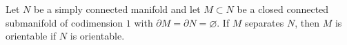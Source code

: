 Let $N$ be a simply connected manifold and let $M \subset N$ be a closed connected submanifold of codimension $1$ with $\partial M = \partial N = \varnothing$. If $M$ separates $N$, then $M$ is orientable if $N$ is orientable.
